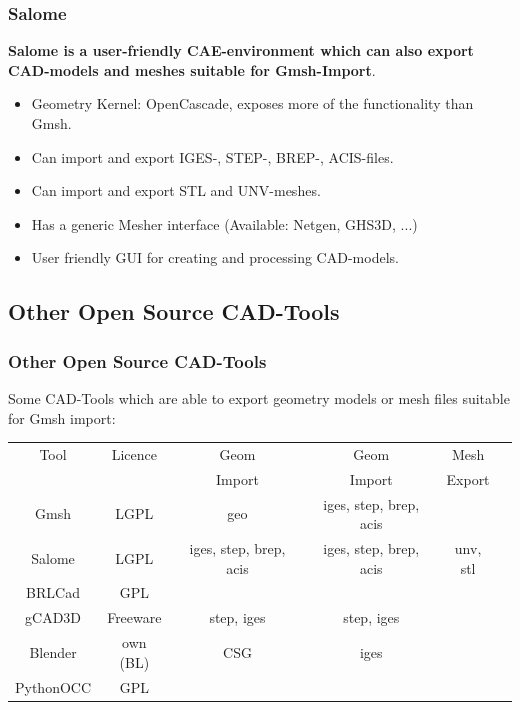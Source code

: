 \begin{frame}
  \frametitle{Salome}
  \textbf{Salome is a user-friendly CAE-environment which can also export
  CAD-models and meshes suitable for Gmsh-Import}.
  \begin{itemize}
    \item Geometry Kernel: OpenCascade, exposes more of the functionality than Gmsh.
    \item Can import and export IGES-, STEP-, BREP-, ACIS-files.
    \item Can import and export STL and UNV-meshes.
    \item Has a generic Mesher interface (Available: Netgen, GHS3D, ...)
    \item User friendly GUI for creating and processing CAD-models.
  \end{itemize}
\end{frame}

\subsection{Other Open Source CAD-Tools}

\begin{frame}
  \frametitle{Other Open Source CAD-Tools}
    Some CAD-Tools which are able to export geometry models or mesh
    files suitable for Gmsh import:
    \begin{center}
      \small
      \begin{tabular}{|c|c|c|c|c|c|}
        \hline
        Tool & Licence & Geom & Geom & Mesh
        \\
        &  & Import & Import & Export
        \\
        \hline
        \hline
        Gmsh & LGPL & geo & iges, step, brep, acis &
        \\
        \hline
        Salome & LGPL & iges, step, brep, acis & iges, step, brep, acis & unv,
        stl
        \\
        \hline
        BRLCad & GPL &  &  &
        \\
        \hline
        gCAD3D & Freeware & step, iges & step, iges &
        \\
        \hline
        Blender & own (BL) & CSG & iges &
        \\
        \hline
        PythonOCC & GPL & &  &
        \\
        \hline
      \end{tabular}
    \end{center}
\end{frame}

\cleardoublepage
